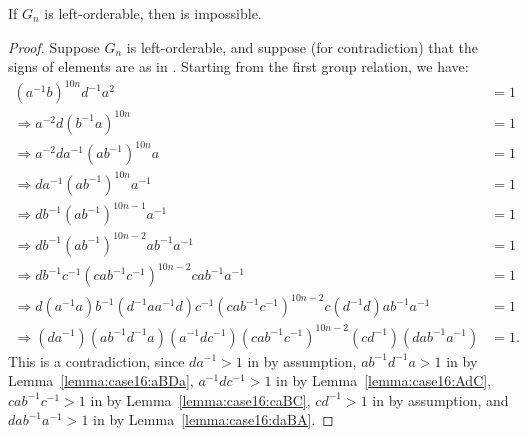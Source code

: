 \begin{proposition} If $G_n$ is left-orderable, then  is impossible.
\label{proposition:case16.B}
\end{proposition}
\begin{proof} Suppose $G_n$ is left-orderable, and suppose (for contradiction) that the signs of elements are as in . Starting from the first group relation, we have:
\begin{align*}
(a^{-1}b)^{10n}d^{-1}a^{2}&=1\\
\Rightarrow{}a^{-2}d(b^{-1}a)^{10n}&=1\\
\Rightarrow{}a^{-2}da^{-1}(ab^{-1})^{10n}a&=1\\
\Rightarrow{}da^{-1}(ab^{-1})^{10n}a^{-1}&=1\\
\Rightarrow{}db^{-1}(ab^{-1})^{10n-1}a^{-1}&=1\\
\Rightarrow{}db^{-1}(ab^{-1})^{10n-2}ab^{-1}a^{-1}&=1\\
\Rightarrow{}db^{-1}c^{-1}(cab^{-1}c^{-1})^{10n-2}cab^{-1}a^{-1}&=1\\
\Rightarrow{}d(a^{-1}a)b^{-1}(d^{-1}aa^{-1}d)c^{-1}(cab^{-1}c^{-1})^{10n-2}c(d^{-1}d)ab^{-1}a^{-1}&=1\\
\Rightarrow{}(da^{-1})(ab^{-1}d^{-1}a)(a^{-1}dc^{-1})(cab^{-1}c^{-1})^{10n-2}(cd^{-1})(dab^{-1}a^{-1})&=1.
\end{align*}
This is a contradiction, since $da^{-1}>1$ in  by assumption, $ab^{-1}d^{-1}a>1$ in  by Lemma~\ref{lemma:case16:aBDa}, $a^{-1}dc^{-1}>1$ in  by Lemma~\ref{lemma:case16:AdC}, $cab^{-1}c^{-1}>1$ in  by Lemma~\ref{lemma:case16:caBC}, $cd^{-1}>1$ in  by assumption, and $dab^{-1}a^{-1}>1$ in  by Lemma~\ref{lemma:case16:daBA}.
\end{proof}